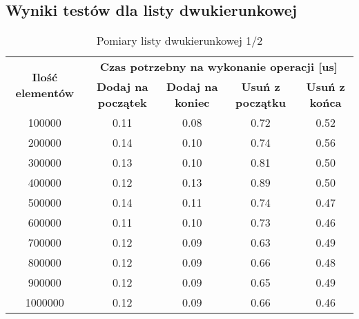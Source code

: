 \documentclass{article}
\begin{document}
    \subsection{Wyniki testów dla listy dwukierunkowej}
    \begin{table}[H]
        \centering
        \begin{tabular}{|c|cccc|}
            \hline
            \multirow{2}{*}{\textbf{Ilość   elementów}} & \multicolumn{4}{c|}{\textbf{Czas   potrzebny na wykonanie operacji {[}us{]}}} \\ \cline{2-5} 
             & \multicolumn{1}{c|}{\textbf{Dodaj na początek}} & \multicolumn{1}{c|}{\textbf{Dodaj na koniec}} & \multicolumn{1}{c|}{\textbf{Usuń z początku}} & \textbf{Usuń z końca} \\ \hline
            100000 & \multicolumn{1}{c|}{0.11} & \multicolumn{1}{c|}{0.08} & \multicolumn{1}{c|}{0.72} & 0.52 \\ \hline
            200000 & \multicolumn{1}{c|}{0.14} & \multicolumn{1}{c|}{0.10} & \multicolumn{1}{c|}{0.74} & 0.56 \\ \hline
            300000 & \multicolumn{1}{c|}{0.13} & \multicolumn{1}{c|}{0.10} & \multicolumn{1}{c|}{0.81} & 0.50 \\ \hline
            400000 & \multicolumn{1}{c|}{0.12} & \multicolumn{1}{c|}{0.13} & \multicolumn{1}{c|}{0.89} & 0.50 \\ \hline
            500000 & \multicolumn{1}{c|}{0.14} & \multicolumn{1}{c|}{0.11} & \multicolumn{1}{c|}{0.74} & 0.47 \\ \hline
            600000 & \multicolumn{1}{c|}{0.11} & \multicolumn{1}{c|}{0.10} & \multicolumn{1}{c|}{0.73} & 0.46 \\ \hline
            700000 & \multicolumn{1}{c|}{0.12} & \multicolumn{1}{c|}{0.09} & \multicolumn{1}{c|}{0.63} & 0.49 \\ \hline
            800000 & \multicolumn{1}{c|}{0.12} & \multicolumn{1}{c|}{0.09} & \multicolumn{1}{c|}{0.66} & 0.48 \\ \hline
            900000 & \multicolumn{1}{c|}{0.12} & \multicolumn{1}{c|}{0.09} & \multicolumn{1}{c|}{0.65} & 0.49 \\ \hline
            1000000 & \multicolumn{1}{c|}{0.12} & \multicolumn{1}{c|}{0.09} & \multicolumn{1}{c|}{0.66} & 0.46 \\ \hline
        \end{tabular}
        \caption{Pomiary listy dwukierunkowej 1/2}
    \end{table}
\end{document}
